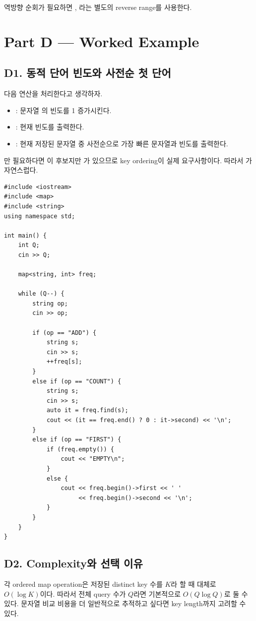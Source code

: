 역방향 순회가 필요하면 , 라는 별도의 reverse range를 사용한다.

\section{Part D --- Worked Example}

\subsection{D1. 동적 단어 빈도와 사전순 첫 단어}
다음 연산을 처리한다고 생각하자.
\begin{itemize}
\item {}: 문자열 의 빈도를 1 증가시킨다.
\item {}: 현재 빈도를 출력한다.
\item {}: 현재 저장된 문자열 중 사전순으로 가장 빠른 문자열과 빈도를 출력한다.
\end{itemize}

만 필요하다면 이 후보지만 가 있으므로 key ordering이 실제 요구사항이다. 따라서 가 자연스럽다.

\begin{lstlisting}
#include <iostream>
#include <map>
#include <string>
using namespace std;

int main() {
    int Q;
    cin >> Q;

    map<string, int> freq;

    while (Q--) {
        string op;
        cin >> op;

        if (op == "ADD") {
            string s;
            cin >> s;
            ++freq[s];
        }
        else if (op == "COUNT") {
            string s;
            cin >> s;
            auto it = freq.find(s);
            cout << (it == freq.end() ? 0 : it->second) << '\n';
        }
        else if (op == "FIRST") {
            if (freq.empty()) {
                cout << "EMPTY\n";
            }
            else {
                cout << freq.begin()->first << ' '
                     << freq.begin()->second << '\n';
            }
        }
    }
}
\end{lstlisting}

\subsection{D2. Complexity와 선택 이유}
각 ordered map operation은 저장된 distinct key 수를 $K$라 할 때 대체로 $O(\log K)$이다. 따라서 전체 query 수가 $Q$라면 기본적으로 $O(Q\log Q)$로 둘 수 있다. 문자열 비교 비용을 더 일반적으로 추적하고 싶다면 key length까지 고려할 수 있다.


